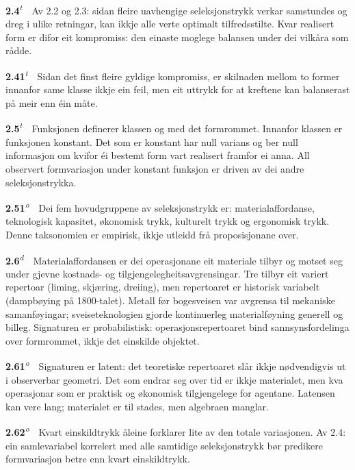 \documentclass[10pt]{article}
\begin{document}
\noindent\textbf{2.4}\textsuperscript{\textit{t}}~~Av 2.2 og 2.3: sidan fleire uavhengige seleksjonstrykk verkar samstundes og dreg i ulike retningar, kan ikkje alle verte optimalt tilfredsstilte. Kvar realisert form er difor eit kompromiss: den einaste moglege balansen under dei vilkåra som rådde.




\noindent\textbf{2.41}\textsuperscript{\textit{t}}~~Sidan det finst fleire gyldige kompromiss, er skilnaden mellom to former innanfor same klasse ikkje ein feil, men eit uttrykk for at kreftene kan balanserast på meir enn éin måte.




\noindent\textbf{2.5}\textsuperscript{\textit{t}}~~Funksjonen definerer klassen og med det formrommet. Innanfor klassen er funksjonen konstant. Det som er konstant har null varians og ber null informasjon om kvifor éi bestemt form vart realisert framfor ei anna. All observert formvariasjon under konstant funksjon er driven av dei andre seleksjonstrykka.




\noindent\textbf{2.51}\textsuperscript{\textit{o}}~~Dei fem hovudgruppene av seleksjonstrykk er: materialaffordanse, teknologisk kapasitet, økonomisk trykk, kulturelt trykk og ergonomisk trykk. Denne taksonomien er empirisk, ikkje utleidd frå proposisjonane over.




\noindent\textbf{2.6}\textsuperscript{\textit{d}}~~Materialaffordansen er dei operasjonane eit materiale tilbyr og motset seg under gjevne kostnads- og tilgjengelegheitsavgrensingar. Tre tilbyr eit variert repertoar (liming, skjæring, dreiing), men repertoaret er historisk variabelt (dampbøying på 1800-talet). Metall før bogesveisen var avgrensa til mekaniske samanføyingar; sveiseteknologien gjorde kontinuerleg materialføyning generell og billeg. Signaturen er probabilistisk: operasjonsrepertoaret bind sannsynsfordelinga over formrommet, ikkje det einskilde objektet.




\noindent\textbf{2.61}\textsuperscript{\textit{o}}~~Signaturen er latent: det teoretiske repertoaret slår ikkje nødvendigvis ut i observerbar geometri. Det som endrar seg over tid er ikkje materialet, men kva operasjonar som er praktisk og økonomisk tilgjengelege for agentane. Latensen kan vere lang; materialet er til stades, men algebraen manglar.




\noindent\textbf{2.62}\textsuperscript{\textit{o}}~~Kvart einskildtrykk åleine forklarer lite av den totale variasjonen. Av 2.4: ein samlevariabel korrelert med alle samtidige seleksjonstrykk bør predikere formvariasjon betre enn kvart einskildtrykk.
\end{document}
